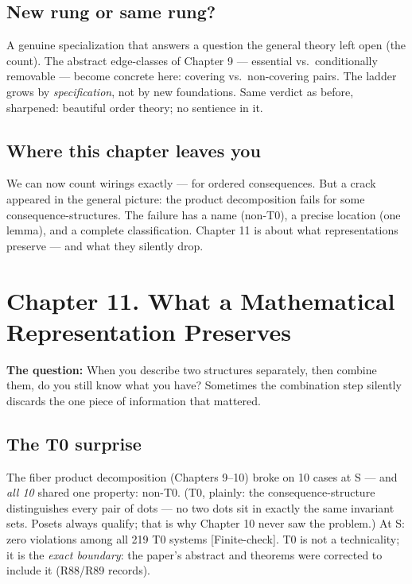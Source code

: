 \documentclass[
  11pt,
]{book}
\begin{document}
\section{New rung or same rung?}\label{new-rung-or-same-rung}

A genuine specialization that answers a question the general theory left
open (the count). The abstract edge-classes of Chapter 9 --- essential
vs.~conditionally removable --- become concrete here: covering
vs.~non-covering pairs. The ladder grows by \emph{specification}, not by
new foundations. Same verdict as before, sharpened: beautiful order
theory; no sentience in it.

\section{Where this chapter leaves
you}\label{where-this-chapter-leaves-you-8}

We can now count wirings exactly --- for ordered consequences. But a
crack appeared in the general picture: the product decomposition fails
for some consequence-structures. The failure has a name (non-T0), a
precise location (one lemma), and a complete classification. Chapter 11
is about what representations preserve --- and what they silently drop.

\newpage

\chapter{Chapter 11. What a Mathematical Representation
Preserves}\label{chapter-11.-what-a-mathematical-representation-preserves}

\textbf{The question:} When you describe two structures separately, then
combine them, do you still know what you have? Sometimes the combination
step silently discards the one piece of information that mattered.

\section{The T0 surprise}\label{the-t0-surprise}

The fiber product decomposition (Chapters 9--10) broke on 10 cases at
\textbar S --- and \emph{all 10} shared one property: non-T0.
(T0, plainly: the consequence-structure distinguishes every pair of dots
--- no two dots sit in exactly the same invariant sets. Posets always
qualify; that is why Chapter 10 never saw the problem.) At
\textbar S: zero violations among all 219 T0 systems
{[}Finite-check{]}. T0 is not a technicality; it is the \emph{exact
boundary}: the paper's abstract and theorems were corrected to include
it (R88/R89 records).
\end{document}
